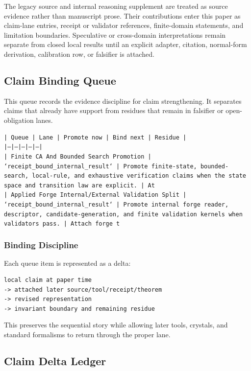 \documentclass[11pt]{article}
\begin{document}
The legacy source and internal reasoning supplement are treated as source
evidence rather than manuscript prose. Their contributions enter this paper as
claim-lane entries, receipt or validator references, finite-domain statements,
and limitation boundaries. Speculative or cross-domain interpretations remain
separate from closed local results until an explicit adapter, citation,
normal-form derivation, calibration row, or falsifier is attached.
\subsection*{Claim Binding Queue}

This queue records the evidence discipline for claim strengthening. It separates claims that already have support from residues that remain in falsifier or open-obligation lanes.

\noindent\texttt{| Queue | Lane | Promote now | Bind next | Residue |}\\
\noindent\texttt{|---|---|---|---|---|}\\
\noindent\texttt{| Finite CA And Bounded Search Promotion | `receipt\_bound\_internal\_result` | Promote finite-state, bounded-search, local-rule, and exhaustive verification claims when the state space and transition law are explicit. | At}\\
\noindent\texttt{| Applied Forge Internal/External Validation Split | `receipt\_bound\_internal\_result` | Promote internal forge reader, descriptor, candidate-generation, and finite validation kernels when validators pass. | Attach forge t}\\

\subsubsection*{Binding Discipline}

Each queue item is represented as a delta:

\begin{verbatim}
local claim at paper time
-> attached later source/tool/receipt/theorem
-> revised representation
-> invariant boundary and remaining residue
\end{verbatim}

This preserves the sequential story while allowing later tools, crystals, and
standard formalisms to return through the proper lane.

\subsection*{Claim Delta Ledger}
\end{document}

